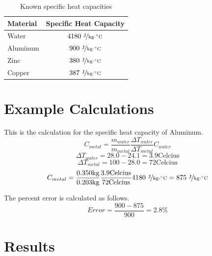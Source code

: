 \documentclass{article}
\begin{document}
\begin{table}[htbp]
\begin{center}
\footnotesize
\begin{tabular}{lc}
\toprule
 Material  & Specific Heat Capacity \\                                                      
\midrule
  
    Water   & $4180\  \nicefrac{ \text{J}}{\text{kg}\cdot {}^{\circ}\text{C}}$       \\
    Aluminum   & $900\   \nicefrac{ \text{J}}{\text{kg}\cdot {}^{\circ}\text{C}}$       \\
    Zinc     & $380\  \nicefrac{ \text{J}}{\text{kg}\cdot {}^{\circ}\text{C}}$      \\
     Copper     & $387\   \nicefrac{ \text{J}}{\text{kg}\cdot {}^{\circ}\text{C}}$      \\
    
\bottomrule
\end{tabular}
\end{center}
  \caption{Known specific heat capacities}
  \label{tab:font-sizes}
\end{table}

\section{Example Calculations}
This is the calculation for the specific heat capacity of Aluminum.
$$C_{metal}=\frac{m_{water}}{m_{metal}}  \frac{\Delta T_{water}}{\Delta T_{metal}}    C_{water}$$
$$\Delta T_{water}=28.0-24.1=3.9 \text{Celcius}$$
$$\Delta T_{metal}=100-28.0=72 \text{Celcius}$$
$$C_{metal}=\frac{0.350 \text{kg}}{0.203 \text{kg}}  \frac{3.9 \text{Celcius}}{72 \text{Celcius}}    4180\  \nicefrac{ \text{J}}{\text{kg}\cdot {}^{\circ}\text{C}}=875\  \nicefrac{ \text{J}}{\text{kg}\cdot {}^{\circ}\text{C}}$$

The percent error is calculated as follows.
$$Error=\frac{900-875}{900}=2.8\%$$



\section{Results}
\end{document}
